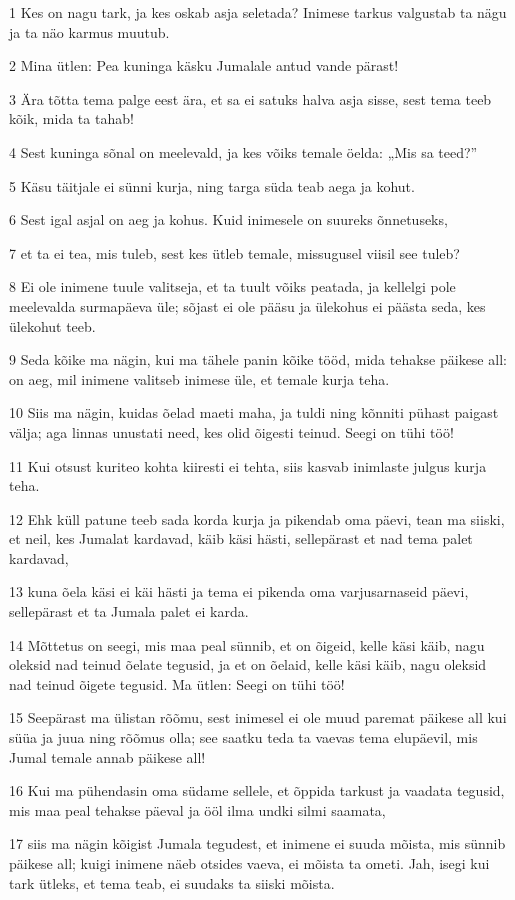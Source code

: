 \par 1 Kes on nagu tark, ja kes oskab asja seletada? Inimese tarkus valgustab ta nägu ja ta näo karmus muutub.
\par 2 Mina ütlen: Pea kuninga käsku Jumalale antud vande pärast!
\par 3 Ära tõtta tema palge eest ära, et sa ei satuks halva asja sisse, sest tema teeb kõik, mida ta tahab!
\par 4 Sest kuninga sõnal on meelevald, ja kes võiks temale öelda: „Mis sa teed?”
\par 5 Käsu täitjale ei sünni kurja, ning targa süda teab aega ja kohut.
\par 6 Sest igal asjal on aeg ja kohus. Kuid inimesele on suureks õnnetuseks,
\par 7 et ta ei tea, mis tuleb, sest kes ütleb temale, missugusel viisil see tuleb?
\par 8 Ei ole inimene tuule valitseja, et ta tuult võiks peatada, ja kellelgi pole meelevalda surmapäeva üle; sõjast ei ole pääsu ja ülekohus ei päästa seda, kes ülekohut teeb.
\par 9 Seda kõike ma nägin, kui ma tähele panin kõike tööd, mida tehakse päikese all: on aeg, mil inimene valitseb inimese üle, et temale kurja teha.
\par 10 Siis ma nägin, kuidas õelad maeti maha, ja tuldi ning kõnniti pühast paigast välja; aga linnas unustati need, kes olid õigesti teinud. Seegi on tühi töö!
\par 11 Kui otsust kuriteo kohta kiiresti ei tehta, siis kasvab inimlaste julgus kurja teha.
\par 12 Ehk küll patune teeb sada korda kurja ja pikendab oma päevi, tean ma siiski, et neil, kes Jumalat kardavad, käib käsi hästi, sellepärast et nad tema palet kardavad,
\par 13 kuna õela käsi ei käi hästi ja tema ei pikenda oma varjusarnaseid päevi, sellepärast et ta Jumala palet ei karda.
\par 14 Mõttetus on seegi, mis maa peal sünnib, et on õigeid, kelle käsi käib, nagu oleksid nad teinud õelate tegusid, ja et on õelaid, kelle käsi käib, nagu oleksid nad teinud õigete tegusid. Ma ütlen: Seegi on tühi töö!
\par 15 Seepärast ma ülistan rõõmu, sest inimesel ei ole muud paremat päikese all kui süüa ja juua ning rõõmus olla; see saatku teda ta vaevas tema elupäevil, mis Jumal temale annab päikese all!
\par 16 Kui ma pühendasin oma südame sellele, et õppida tarkust ja vaadata tegusid, mis maa peal tehakse päeval ja ööl ilma undki silmi saamata,
\par 17 siis ma nägin kõigist Jumala tegudest, et inimene ei suuda mõista, mis sünnib päikese all; kuigi inimene näeb otsides vaeva, ei mõista ta ometi. Jah, isegi kui tark ütleks, et tema teab, ei suudaks ta siiski mõista.


